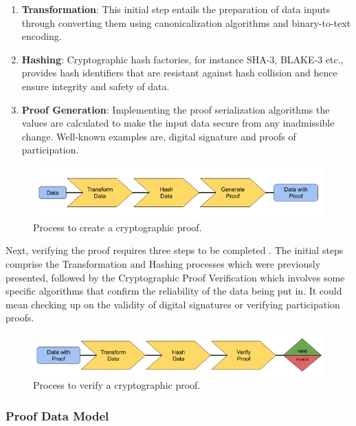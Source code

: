 \begin{enumerate}
  \item \textbf{Transformation}: This initial step entails the preparation of data inputs through converting them using canonicalization algorithms and binary-to-text encoding.
  \item \textbf{Hashing}: Cryptographic hash factories, for instance SHA-3, BLAKE-3 etc., provides hash identifiers that are resistant against hash collision and hence 
  ensure integrity and safety of data.
  \item \textbf{Proof Generation}: Implementing the proof serialization algorithms the values are calculated to make the input data secure from any inadmissible change. 
  Well-known examples are, digital signature and proofs of participation.
\end{enumerate}

\begin{figure}[h]  
  \centering
  \includegraphics[width=1\textwidth]{Images/c5_1.png} 
  \caption{Process to create a cryptographic proof.}
\end{figure}

Next, verifying the proof requires three steps to be completed \cite{VCDataIntegrity}. The initial steps comprise the Transformation and Hashing processes which were previously presented, 
followed by the Cryptographic Proof Verification which involves some specific algorithms that confirm the reliability of the data being put in. It could mean checking up 
on the validity of digital signatures or verifying participation proofs.

\begin{figure}[h]  
  \centering
  \includegraphics[width=1\textwidth]{Images/c5_2.png} 
  \caption{Process to verify a cryptographic proof.}
\end{figure}

\subsubsection{Proof Data Model}

